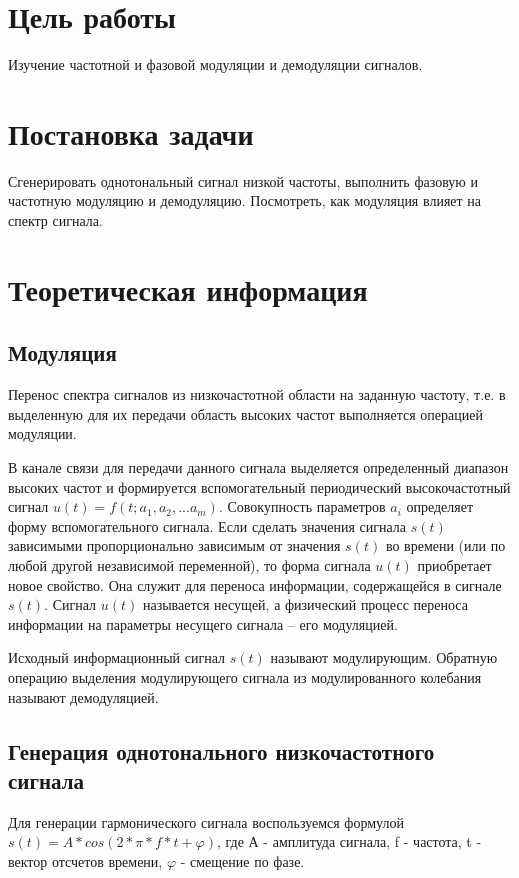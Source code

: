 

\setcounter{tocdepth}{3}







\section{Цель работы}
Изучение частотной и фазовой модуляции и демодуляции сигналов.
\section{Постановка задачи}
Сгенерировать однотональный сигнал низкой частоты, выполнить фазовую и частотную модуляцию и демодуляцию. Посмотреть, как модуляция влияет на спектр сигнала.

\section{Теоретическая информация}

\subsection{Модуляция}
Перенос спектра сигналов из низкочастотной области на заданную частоту, т.е. в выделенную для их передачи область высоких частот выполняется операцией модуляции.   

В канале связи для передачи данного сигнала выделяется определенный диапазон высоких частот и формируется вспомогательный периодический высокочастотный сигнал $u(t)   =   f(t;   a_1,   a_2,   ...   a_m)$. Совокупность параметров $a_i$ определяет форму вспомогательного сигнала. Если сделать значения сигнала $s(t)$ зависимыми пропорционально зависимым от значения $s(t)$ во времени (или по любой другой независимой переменной), то форма сигнала $u(t)$ приобретает новое свойство. Она служит для переноса информации, содержащейся в сигнале $s(t)$. Сигнал $u(t)$ называется несущей,  а физический процесс переноса информации на
параметры несущего сигнала     –     его модуляцией. 

Исходный информационный сигнал $s(t)$ называют модулирующим. Обратную операцию выделения модулирующего сигнала из модулированного колебания называют демодуляцией.

\subsection{Генерация однотонального низкочастотного сигнала}
Для генерации гармонического сигнала воспользуемся формулой $s(t) = A*cos(2*\pi * f*t + \varphi)$, где А - амплитуда сигнала, f - частота, t - вектор отсчетов времени, $\varphi$ - смещение по фазе.

